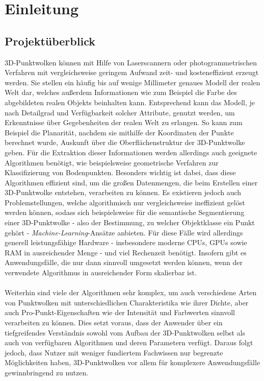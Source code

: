
\chapter{Einleitung}
\label{chap:intro}

\section{Projektüberblick}

3D-Punktwolken können mit Hilfe von Laserscannern oder photogrammetrischen Verfahren mit vergleichsweise geringem Aufwand zeit- und kosteneffizient erzeugt werden. Sie stellen ein häufig bis auf wenige Millimeter genaues Modell der realen Welt dar, welches außerdem Informationen wie zum Beispiel die Farbe des abgebildeten realen Objekts beinhalten kann. Entsprechend kann das Modell, je nach Detailgrad und Verfügbarkeit solcher Attribute, genutzt werden, um Erkenntnisse über Gegebenheiten der realen Welt zu erlangen. So kann zum Beispiel die Planarität, nachdem sie mithilfe der Koordinaten der Punkte berechnet wurde, Auskunft über die Oberflächenstruktur der 3D-Punktwolke geben. Für die Extraktion dieser Informationen werden allerdings auch geeignete Algorithmen benötigt, wie beispielsweise geometrische Verfahren zur Klassifizierung von Bodenpunkten. Besonders wichtig ist dabei, dass diese Algorithmen effizient sind, um die großen Datenmengen, die beim Erstellen einer 3D-Punktwolke entstehen, verarbeiten zu können. Es existieren jedoch auch Problemstellungen, welche algorithmisch nur vergleichsweise ineffizient gelöst werden können, sodass sich beispielsweise für die semantische Segmentierung einer 3D-Punktwolke - also der Bestimmung, zu welcher Objektklasse ein Punkt gehört - \textit{Machine-Learning}-Ansätze anbieten. Für diese Fälle wird allerdings generell leistungsfähige Hardware - insbesondere moderne CPUs, GPUs sowie RAM in ausreichender Menge - und viel Rechenzeit benötigt. Insofern gibt es Anwendungsfälle, die nur dann sinnvoll umgesetzt werden können, wenn der verwendete Algorithmus in ausreichender Form skalierbar ist. \\\\
Weiterhin sind viele der Algorithmen sehr komplex, um auch verschiedene Arten von Punktwolken mit unterschiedlichen Charakteristika wie ihrer Dichte, aber auch Pro-Punkt-Eigenschaften wie der Intensität und Farbwerten sinnvoll verarbeiten zu können. Dies setzt voraus, dass der Anwender über ein tiefgreifendes Verständnis sowohl vom Aufbau der 3D-Punktwolken selbst als auch von verfügbaren Algorithmen und deren Parametern verfügt. Daraus folgt jedoch, dass Nutzer mit weniger fundiertem Fachwissen nur begrenzte Möglichkeiten haben, 3D-Punktwolken vor allem für komplexere Anwendungsfälle gewinnbringend zu nutzen. \\\\
